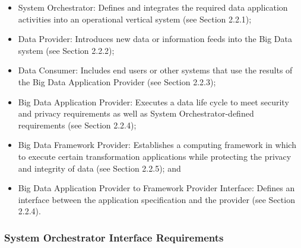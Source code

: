 \documentclass[9pt,]{article}
\providecommand{\tightlist}{%
  \setlength{\itemsep}{0pt}\setlength{\parskip}{0pt}}
\begin{document}
\begin{itemize}
\tightlist
\item
  System Orchestrator: Defines and integrates the required data
  application activities into an operational vertical system (see
  Section 2.2.1);
\item
  Data Provider: Introduces new data or information feeds into the Big
  Data system (see Section 2.2.2);
\item
  Data Consumer: Includes end users or other systems that use the
  results of the Big Data Application Provider (see Section 2.2.3);
\item
  Big Data Application Provider: Executes a data life cycle to meet
  security and privacy requirements as well as System
  Orchestrator-defined requirements (see Section 2.2.4);
\item
  Big Data Framework Provider: Establishes a computing framework in
  which to execute certain transformation applications while protecting
  the privacy and integrity of data (see Section 2.2.5); and
\item
  Big Data Application Provider to Framework Provider Interface: Defines
  an interface between the application specification and the provider
  (see Section 2.2.4).
\end{itemize}

\hypertarget{system-orchestrator-interface-requirements}{%
\subsubsection{System Orchestrator Interface
Requirements}\label{system-orchestrator-interface-requirements}}
\end{document}
